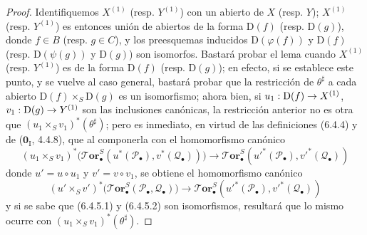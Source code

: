 \documentclass[10pt,oneside,openany]{book}
\theoremstyle{egaenv}\newtheorem*{env}{---}
\theoremstyle{egastatement}
\theoremstyle{egadescription}
\renewcommand{\to}{\mathchoice{\longrightarrow}{\rightarrow}{\rightarrow}{\rightarrow}}
\begin{document}
\begin{proof}
Identifiquemos $X^{(1)}$ (resp. $Y^{(1)}$) con un abierto de $X$ (resp. $Y$);
$X^{(1)}$ (resp. $Y^{(1)}$) es entonces unión de abiertos de la forma
$\mathrm D(f)$ (resp. $\mathrm D(g)$), donde $f\in B$ (resp. $g\in C$), y los
preesquemas inducidos $\mathrm D(\varphi(f))$ y $\mathrm D(f)$ (resp.
$\mathrm D(\psi(g))$ y $\mathrm D(g)$) son isomorfos. Bastará probar
el lema cuando $X^{(1)}$ (resp. $Y^{(1)}$) es de la forma $\mathrm D(f)$
(resp. $\mathrm D(g)$); en efecto, si se establece este punto, y se vuelve al
caso general, bastará probar que la restricción de $\theta^\sharp$ a
cada abierto $\mathrm D(f)\times_S\mathrm D(g)$ es un isomorfismo; ahora bien, si
$u_1:\mathrm D(f)\to X^{(1)}$, $v_1:\mathrm D(g)\to Y^{(1)}$ son las
inclusiones canónicas, la restricción anterior no es otra que
$(u_1\times_S v_1)^*(\theta^\sharp)$; pero es inmediato, en virtud de las
definiciones (6.4.4) y de ($\mathbf{0}_{\mathrm I}$, 4.4.8), que al componerla con
el homomorfismo canónico
\[
  (u_1\times_S v_1)^*
  \bigl(\boldsymbol{\mathscr{T}\!or}_\bullet^S
    (u^*(\mathscr P_\bullet),v^*(\mathscr Q_\bullet))\bigr)
  \longrightarrow
  \boldsymbol{\mathscr{T}\!or}_\bullet^S
  (u'^*(\mathscr P_\bullet),v'^*(\mathscr Q_\bullet))
  \tag{6.4.5.1}\label{III.6.4.5.1.fr}
\]
donde $u'=u\circ u_1$ y $v'=v\circ v_1$, se obtiene el homomorfismo canónico
\[
  (u'\times_S v')^*
  \bigl(\boldsymbol{\mathscr{T}\!or}_\bullet^S(\mathscr P_\bullet,\mathscr Q_\bullet)\bigr)
  \longrightarrow
  \boldsymbol{\mathscr{T}\!or}_\bullet^S
  (u'^*(\mathscr P_\bullet),v'^*(\mathscr Q_\bullet))
  \tag{6.4.5.2}\label{III.6.4.5.2.fr}
\]
y si se sabe que (6.4.5.1) y (6.4.5.2) son isomorfismos,
resultará que lo mismo ocurre con $(u_1\times_S v_1)^*(\theta^\sharp)$.


\end{proof}
\end{document}
